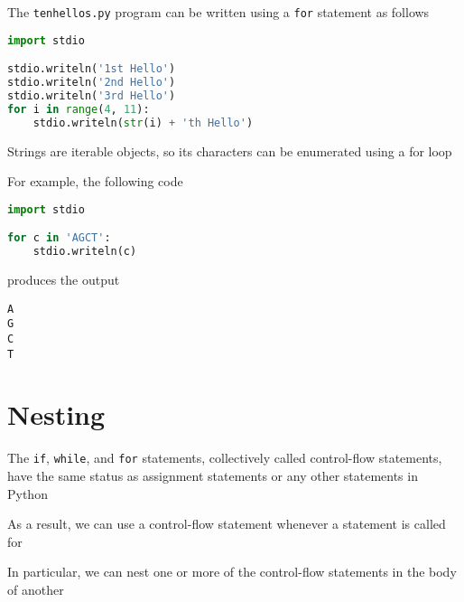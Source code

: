 \documentclass[8pt,a4paper,compress]{beamer}
\begin{document}
\begin{frame}[fragile]
\pause

The \lstinline{tenhellos.py} program can be written using a \lstinline{for} statement as follows

\begin{lstlisting}[language=Python]
import stdio

stdio.writeln('1st Hello')
stdio.writeln('2nd Hello')
stdio.writeln('3rd Hello')
for i in range(4, 11):
    stdio.writeln(str(i) + 'th Hello')
\end{lstlisting}

\pause
\bigskip

Strings are iterable objects, so its characters can be enumerated using a for loop 

\pause
\bigskip

For example, the following code
\begin{lstlisting}[language=Python]
import stdio

for c in 'AGCT':
    stdio.writeln(c)
\end{lstlisting}

produces the output

\begin{lstlisting}[language={}]
A
G
C
T
\end{lstlisting}
\end{frame}

\section{Nesting}
\begin{frame}[fragile]
\pause

The \lstinline{if}, \lstinline{while}, and \lstinline{for} statements, collectively called control-flow statements, have the same status as assignment statements or any other statements in Python

\pause
\bigskip

As a result, we can use a control-flow statement whenever a statement is called for

\pause
\bigskip

In particular, we can nest one or more of the control-flow statements in the body of another
\end{frame}
\end{document}
